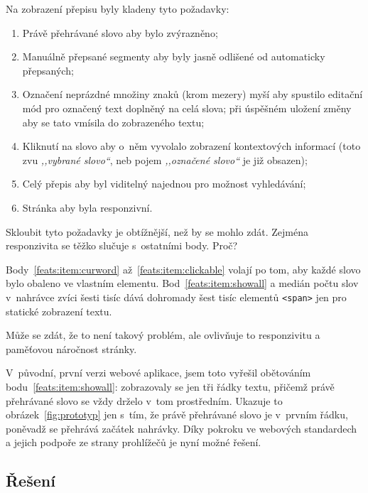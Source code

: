 Na zobrazení přepisu byly kladeny tyto požadavky:
\begin{enumerate}
\item{
    Právě přehrávané slovo aby bylo zvýrazněno;
    \label{feats:item:curword}
}
\item{
    Manuálně přepsané segmenty aby byly jasně odlišené od automaticky
    přepsaných;
    \label{feats:item:manualdistinct}
}
\item{
    Označení neprázdné množiny znaků (krom mezery) myší aby spustilo editační
    mód pro označený text doplněný na celá slova;
    při úspěšném uložení změny aby se tato vmísila do zobrazeného textu;
    \label{feats:item:selectable}
}
\item{
    Kliknutí na slovo aby o~něm vyvolalo zobrazení kontextových informací
    (toto zvu {\em ,,vybrané slovo``}, neb pojem {\em ,,označené slovo``} je již
    obsazen);
    \label{feats:item:clickable}
}
\item{
    Celý přepis aby byl viditelný najednou pro možnost vyhledávání;
    \label{feats:item:showall}
}
\item{
    Stránka aby byla responzivní.
    \label{feats:item:speed}
}
\end{enumerate}

Skloubit tyto požadavky je obtížnější, než by se mohlo zdát. Zejména
responzivita se těžko slučuje s~ostatními body. Proč?

Body~\ref{feats:item:curword} až~\ref{feats:item:clickable} volají po tom, aby
každé slovo bylo obaleno ve vlastním elementu.
Bod~\ref{feats:item:showall} a medián počtu slov v~nahrávce zvíci šesti tisíc
dává dohromady šest tisíc elementů \texttt{<span>} jen pro statické zobrazení
textu.

Může se zdát, že to není takový problém, ale ovlivňuje to responzivitu a
paměťovou náročnost stránky.

V~původní, první verzi webové aplikace, jsem toto vyřešil obětováním
bodu~\ref{feats:item:showall}: zobrazovaly se jen tři řádky textu, přičemž právě
přehrávané slovo se vždy drželo v~tom prostředním. Ukazuje to
obrázek~\ref{fig:prototyp} jen s~tím, že právě přehrávané slovo je v~prvním
řádku, poněvadž se přehrává začátek nahrávky. Díky pokroku ve webových
standardech a jejich podpoře ze strany prohlížečů je nyní možné řešení.

\subsection{Řešení}

